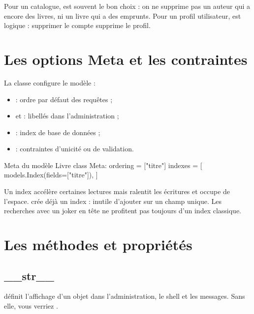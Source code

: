 \begin{bonne}
Pour un catalogue,  est souvent le bon choix : on ne supprime pas un
auteur qui a encore des livres, ni un livre qui a des emprunts. Pour un profil
utilisateur,  est logique : supprimer le compte supprime le profil.
\end{bonne}

\section{Les options Meta et les contraintes}

La classe  configure le modèle :
\begin{itemize}
  \item {} : ordre par défaut des requêtes ;
  \item {} et  : libellés dans
        l'administration ;
  \item {} : index de base de données ;
  \item {} : contraintes d'unicité ou de validation.
\end{itemize}

\begin{codebox}[python]{Meta du modèle Livre}
class Meta:
    ordering = ["titre"]
    indexes = [
        models.Index(fields=["titre"]),
    ]
\end{codebox}

\begin{note}
Un index accélère certaines lectures mais ralentit les écritures et occupe de
l'espace.  crée déjà un index : inutile d'ajouter
 sur un champ unique. Les recherches  avec
un joker en tête ne profitent pas toujours d'un index classique.
\end{note}

\section{Les méthodes et propriétés}

\subsection{\_\_str\_\_}

 définit l'affichage d'un objet dans l'administration, le shell
et les messages. Sans elle, vous verriez .

